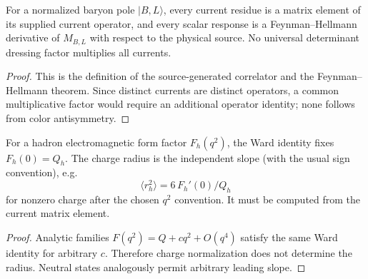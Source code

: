\documentclass[12pt,a4paper]{article}
\begin{document}
\begin{theorem}
\label{p11:thm:native-dressed-baryon-residues}

For a normalized baryon pole \(|B,L\rangle\), every current residue is a matrix element of its supplied current operator, and every scalar response is a Feynman--Hellmann derivative of \(M_{B,L}\) with respect to the physical source.  No universal determinant dressing factor multiplies all currents.
\label{p11:eq:native-dressed-axial-tensor}
\label{p11:eq:native-g-piNN-dressed}
\label{p11:eq:native-magnetic-zs-zv}
\label{p11:eq:native-dressed-magnetic-isoscalar-isovector}
\label{p11:eq:native-dressed-magnetic-moments}
\label{p11:eq:native-dressed-anomalous-magnetic-moments}
\label{p11:eq:native-dressed-sigma-terms}
\label{p11:eq:native-dressed-scalar-fractions}
\end{theorem}
\begin{proof}

This is the definition of the source-generated correlator and the Feynman--Hellmann theorem.  Since distinct currents are distinct operators, a common multiplicative factor would require an additional operator identity; none follows from color antisymmetry.
\end{proof}

\begin{theorem}
\label{p11:thm:finite-em-current-radius-reclosure}

For a hadron electromagnetic form factor \(F_h(q^2)\), the Ward identity fixes \(F_h(0)=Q_h\).  The charge radius is the independent slope (with the usual sign convention), e.g.
\[
\langle r_h^2\rangle=6\,F_h'(0)/Q_h
\]
for nonzero charge after the chosen \(q^2\) convention.  It must be computed from the current matrix element.
\label{p11:eq:finite-em-current-radius-reclosure-form-factor}
\label{p11:eq:finite-em-current-radius-xi-values}
\label{p11:eq:em-radius-reclosure-derived}
\label{p11:eq:em-radius-reclosure-numerics}
\end{theorem}
\begin{proof}

Analytic families \(F(q^2)=Q+cq^2+O(q^4)\) satisfy the same Ward identity for arbitrary \(c\).  Therefore charge normalization does not determine the radius.  Neutral states analogously permit arbitrary leading slope.
\end{proof}
\end{document}
